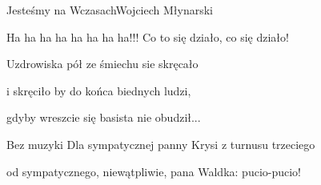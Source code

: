 \begin{song}{Jesteśmy na Wczasach}{}{}{Wojciech Młynarski}{}{}
  \begin{SBVerse}
    Ha ha ha ha ha ha ha ha!!! Co to się działo, co się działo!

    Uzdrowiska pół ze śmiechu sie skręcało

    i skręciło by do końca biednych ludzi,

    gdyby wreszcie się basista nie obudził...

       

      
  \end{SBVerse}

  \begin{SBBracket}{Bez muzyki}
    Dla sympatycznej panny Krysi z turnusu trzeciego

    od sympatycznego, niewątpliwie, pana Waldka: pucio-pucio!
  \end{SBBracket}
\end{song}
